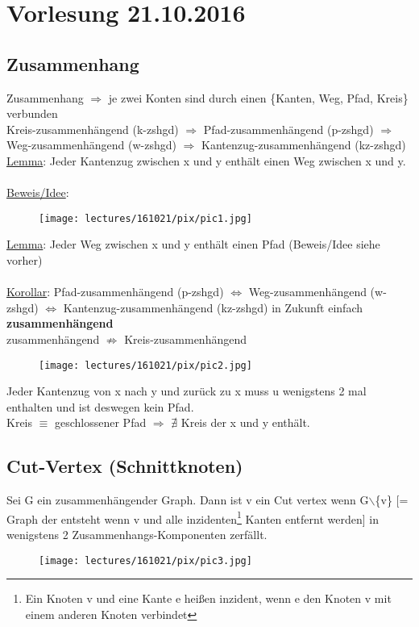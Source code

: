 \section{Vorlesung 21.10.2016}
\subsection{Zusammenhang}
Zusammenhang $\Rightarrow$ je zwei Konten sind durch einen \{Kanten, Weg, Pfad, Kreis\} verbunden\\
Kreis-zusammenhängend (k-zshgd) $\Rightarrow$ Pfad-zusammenhängend (p-zshgd) $\Rightarrow$ Weg-zusammenhängend (w-zshgd) $\Rightarrow$ Kantenzug-zusammenhängend (kz-zshgd)\\

\underline{Lemma}: Jeder Kantenzug zwischen x und y enthält einen Weg zwischen x und y.
\\\\
\underline{Beweis/Idee}:\\
\begin{figure}[htp]
\centering
\texttt{[image: lectures/161021/pix/pic1.jpg]}
\end{figure}

\underline{Lemma}: Jeder Weg zwischen x und y enthält einen Pfad (Beweis/Idee siehe vorher)
\\\\
\underline{Korollar}: Pfad-zusammenhängend (p-zshgd) $\Leftrightarrow$ Weg-zusammenhängend (w-zshgd) $\Leftrightarrow$ Kantenzug-zusammenhängend (kz-zshgd) in Zukunft einfach \textbf{zusammenhängend}\\

zusammenhängend $\nRightarrow$ Kreis-zusammenhängend
\begin{figure}[htp]
\centering
\texttt{[image: lectures/161021/pix/pic2.jpg]}
\end{figure}

Jeder Kantenzug von x nach y und zurück zu x muss u wenigstens 2 mal enthalten und ist deswegen kein Pfad.\\
Kreis $\equiv$ geschlossener Pfad $\Rightarrow$ $\nexists$ Kreis der x und y enthält.

\subsection{Cut-Vertex (Schnittknoten)}
Sei G ein zusammenhängender Graph. Dann ist v ein Cut vertex wenn G$\backslash$\{v\} [= Graph der entsteht wenn v und alle inzidenten\footnote{Ein Knoten v und eine Kante e heißen inzident, wenn e den Knoten v mit einem anderen Knoten verbindet} Kanten entfernt werden] in wenigstens 2 Zusammenhangs-Komponenten zerfällt.
\begin{figure}[htp]
\centering
\texttt{[image: lectures/161021/pix/pic3.jpg]}
\end{figure}

